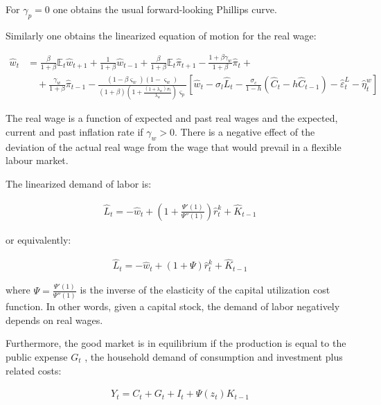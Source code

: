 \documentclass{pracamgr}
\numberwithin{equation}{section}
\begin{document}
For $\gamma_{p} = 0$ one obtains the usual forward-looking Phillips curve.

Similarly one obtains the linearized equation of motion for the real wage:

\begin{align}
\hat{w}_{t} &= \frac{\beta}{1+\beta} \mathbb{E}_{t} \hat{w}_{t+1} + \frac{1}{1+\beta} \hat{w}_{t-1} + \frac{\beta}{1+\beta} \mathbb{E}_{t} \hat{\pi}_{t+1} - \frac{1+ \beta \gamma_{w}}{1+\beta} \hat{\pi}_{t} + \nonumber \\
& \quad + \frac{\gamma_{w}}{1+\beta} \hat{\pi}_{t-1} - \frac{\left( 1 - \beta \varsigma_{w} \right) \left( 1 - \varsigma_{w} \right)}{\left(1+\beta \right) \left( 1 + \frac{\left(1+\lambda_{w}\right)\sigma_{l}}{\lambda_{w}}  \right) \varsigma_{p}} \left[
\hat{w}_{t} - \sigma_{l} \hat{L}_{t} - \frac{\sigma_{c}}{1-h} \left( \hat{C}_{t} - h \hat{C}_{t-1} \right) - \hat{\varepsilon}_{t}^{L} - \hat{\eta}_{t}^{w} \right]
\end{align}

The real wage is a function of expected and past real wages and the expected, current and past inflation rate if $\gamma_{w}>0$. There is a negative effect of the deviation of the actual real wage from the wage that would prevail in a flexible labour market.

The linearized demand of labor is:

\begin{align}
\hat{L}_{t} = - \hat{w}_{t} + \left( 1 + \frac{\Psi'(1)}{\Psi''(1)} \right) \hat{r}^{k}_{t} + \hat{K}_{t-1}
\end{align}

or equivalently:

\begin{align}
\hat{L}_{t} = - \hat{w}_{t} + \left( 1 + \Psi \right) \hat{r}^{k}_{t} + \hat{K}_{t-1}
\end{align}

where $\Psi = \frac{\Psi'(1)}{\Psi''(1)}$ is the inverse of the elasticity of the capital utilization cost function. In other words, given a capital stock, the demand of labor negatively depends on real wages.

Furthermore, the good market is in equilibrium if the production is equal to the public expense $G_{t}$ , the household demand of consumption and investment plus related costs:

\begin{align}
Y_{t} = C_{t} + G_{t} + I_{t} + \Psi(z_{t})K_{t-1}
\end{align}
\end{document}
